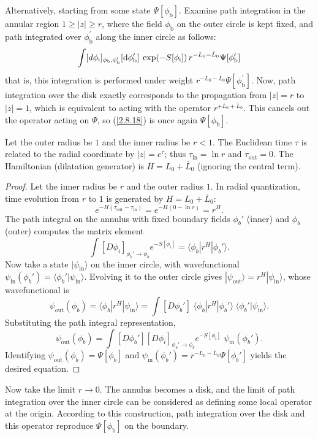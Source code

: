 Alternatively, starting from some state $\Psi[\phi_{\mathrm{b}}]$. Examine path integration in the annular region $1 \geq |z|
\geq r$, 
where the field $\phi_{\mathrm{b}}$ on the outer circle is kept fixed, and path integrated over $\phi_{\mathrm{b}}^\prime$ along the inner circle as follows:    
\begin{equation}\label{2.8.18}
	\int [d \phi_{\mathrm{i}}]_{\phi_{\mathrm{b}}, \phi_{\mathrm{b}}^{\prime}} [\mathrm{d} \phi_{\mathrm{b}}^{\prime}]\:
	\exp (-S[\phi_{\mathrm{i}}])\, r^{-L_{0}-\tilde{L}_{0}} \Psi[\phi_{\mathrm{b}}^{\prime}]
\end{equation}
that is, this integration is performed under weight $r^{-L_{0}-\tilde{L}_{0}} \Psi[\phi_{\mathrm{b}}^{\prime}]$.    
Now, 
path integration over the disk exactly corresponds to the propagation from $|z|=r$ to $|z|=1$, which is equivalent to acting with the operator $r^{+L_{0}+\tilde{L}_{0}}$. This cancels out the operator acting on $\Psi$, so (\ref{2.8.18}) is once again $\Psi[\phi_{\mathrm{b}}]$. 
\begin{tcolorbox}[breakable]			
			Let the outer radius be \(1\) and the inner radius be \(r<1\).  
			The Euclidean time \(\tau\) is related to the radial coordinate by \(|z|=e^{\tau}\);
			thus \(\tau_{\text{in}}=\ln r\) and \(\tau_{\text{out}}=0\).
			The Hamiltonian (dilatation generator) is \(H = L_0+\bar L_0\) (ignoring the central term).
			
		\begin{proof}
			Let the inner radius be $r$ and the outer radius $1$.  
			In radial quantization, time evolution from $r$ to $1$ is generated by $H = L_0+\bar L_0$:
			\[
			e^{-H(\tau_{\text{out}}-\tau_{\text{in}})} = e^{-H(0-\ln r)} = r^{H}.
			\]
			The path integral on the annulus with fixed boundary fields $\phi_b'$ (inner) and $\phi_b$ (outer) computes the matrix element
			\[
			\int [D\phi_i]_{\phi_b'\to\phi_b} e^{-S[\phi_i]} = \langle \phi_b | r^{H} | \phi_b' \rangle.
			\]
			Now take a state $|\psi_{\text{in}}\rangle$ on the inner circle, with wavefunctional $\psi_{\text{in}}(\phi_b') = \langle \phi_b' | \psi_{\text{in}} \rangle$.  
			Evolving it to the outer circle gives $|\psi_{\text{out}}\rangle = r^{H}|\psi_{\text{in}}\rangle$, whose wavefunctional is
			\[
			\psi_{\text{out}}(\phi_b) = \langle \phi_b | r^{H} | \psi_{\text{in}} \rangle
			= \int [D\phi_b'] \; \langle \phi_b | r^{H} | \phi_b' \rangle \; \langle \phi_b' | \psi_{\text{in}} \rangle.
			\]
			Substituting the path integral representation,
			\[
			\psi_{\text{out}}(\phi_b) = \int [D\phi_b'] [D\phi_i]_{\phi_b'\to\phi_b} e^{-S[\phi_i]} \; \psi_{\text{in}}(\phi_b').
			\]
			Identifying $\psi_{\text{out}}(\phi_b) = \Psi[\phi_b]$ and $\psi_{\text{in}}(\phi_b') =r^{-L_0-\bar L_0} \Psi[\phi_b']$ yields the desired equation.
		\end{proof}
\end{tcolorbox}
Now take the limit $r\to 0$. The annulus becomes a disk, and the limit of path integration over the inner circle can be considered as defining some local operator at the origin. According to this construction, path integration over the disk and this operator reproduce $\Psi[\phi_{\mathrm{b}}]$ on the boundary.    

